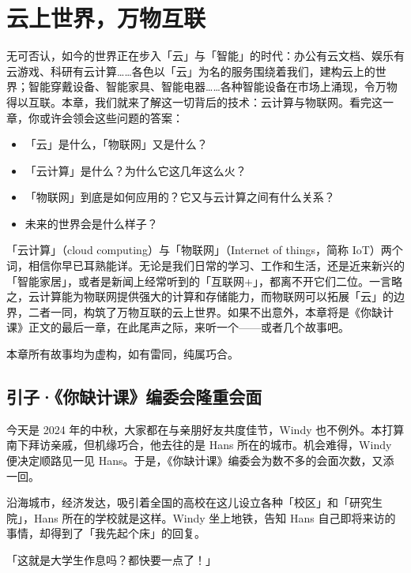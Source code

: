 \chapter{云上世界，万物互联}
\label{cha:cloud-computing-and-iot}

\begin{intro}
  无可否认，如今的世界正在步入「云」与「智能」的时代：办公有云文档、娱乐有云游戏、科研有云计算……各色以「云」为名的服务围绕着我们，建构云上的世界；智能穿戴设备、智能家具、智能电器……各种智能设备在市场上涌现，令万物得以互联。本章，我们就来了解这一切背后的技术：云计算与物联网。看完这一章，你或许会领会这些问题的答案：
  \begin{itemize}
    \item 「云」是什么，「物联网」又是什么？
    \item 「云计算」是什么？为什么它这几年这么火？
    \item 「物联网」到底是如何应用的？它又与云计算之间有什么关系？
    \item 未来的世界会是什么样子？
  \end{itemize}
\end{intro}

「云计算」（cloud computing）与「物联网」（Internet of things，简称 IoT）两个词，相信你早已耳熟能详。无论是我们日常的学习、工作和生活，还是近来新兴的「智能家居」，或者是新闻上经常听到的「互联网+」，都离不开它们二位。一言略之，云计算能为物联网提供强大的计算和存储能力，而物联网可以拓展「云」的边界，二者一同，构筑了万物互联的云上世界。如果不出意外，本章将是《你缺计课》正文的最后一章，在此尾声之际，来听一个——或者几个故事吧。

\begin{note}
  本章所有故事均为虚构，如有雷同，纯属巧合。
\end{note}

\section{引子·《你缺计课》编委会隆重会面}

今天是 2024 年的中秋，大家都在与亲朋好友共度佳节，Windy 也不例外。本打算南下拜访亲戚，但机缘巧合，他去往的是 Hans 所在的城市。机会难得，Windy 便决定顺路见一见 Hans。于是，《你缺计课》编委会为数不多的会面次数，又添一回。

沿海城市，经济发达，吸引着全国的高校在这儿设立各种「校区」和「研究生院」，Hans 所在的学校就是这样。Windy 坐上地铁，告知 Hans 自己即将来访的事情，却得到了「我先起个床」的回复。

「这就是大学生作息吗？都快要一点了！」

